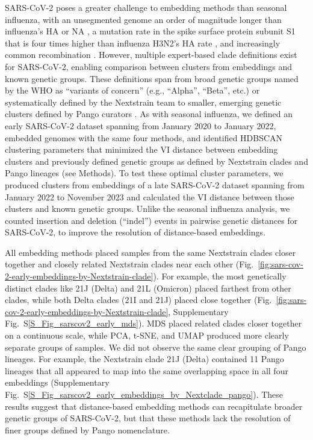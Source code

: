 \documentclass[webpdf,contemporary,large,single]{oup-authoring-template}%
\theoremstyle{thmstyleone}%
\theoremstyle{thmstyletwo}%
\theoremstyle{thmstylethree}%
\begin{document}
SARS-CoV-2 poses a greater challenge to embedding methods than seasonal influenza, with an unsegmented genome an order of magnitude longer than influenza's HA or NA \citep{Zhu2020}, a mutation rate in the spike surface protein subunit S1 that is four times higher than influenza H3N2's HA rate \citep{Kistler2022}, and increasingly common recombination \citep{Focosi2022,Turakhia2022}.
However, multiple expert-based clade definitions exist for SARS-CoV-2, enabling comparison between clusters from embeddings and known genetic groups.
These definitions span from broad genetic groups named by the WHO as ``variants of concern'' (e.g., ``Alpha'', ``Beta'', etc.) \citep{Konings2021} or systematically defined by the Nextstrain team \citep{Hodcroft2020,Bedford2021,Roemer2022} to smaller, emerging genetic clusters defined by Pango curators \citep{OToole2021}.
As with seasonal influenza, we defined an early SARS-CoV-2 dataset spanning from January 2020 to January 2022, embedded genomes with the same four methods, and identified HDBSCAN clustering parameters that minimized the VI distance between embedding clusters and previously defined genetic groups as defined by Nextstrain clades and Pango lineages (see Methods).
To test these optimal cluster parameters, we produced clusters from embeddings of a late SARS-CoV-2 dataset spanning from January 2022 to November 2023 and calculated the VI distance between those clusters and known genetic groups.
Unlike the seasonal influenza analysis, we counted insertion and deletion (``indel'') events in pairwise genetic distances for SARS-CoV-2, to improve the resolution of distance-based embeddings.

All embedding methods placed samples from the same Nextstrain clades closer together and closely related Nextstrain clades near each other (Fig.~\ref{fig:sars-cov-2-early-embeddings-by-Nextstrain-clade}).
For example, the most genetically distinct clades like 21J (Delta) and 21L (Omicron) placed farthest from other clades, while both Delta clades (21I and 21J) placed close together (Fig.~\ref{fig:sars-cov-2-early-embeddings-by-Nextstrain-clade}, Supplementary Fig.~S\ref{S_Fig_sarscov2_early_mds}).
MDS placed related clades closer together on a continuous scale, while PCA, t-SNE, and UMAP produced more clearly separate groups of samples.
We did not observe the same clear grouping of Pango lineages.
For example, the Nextstrain clade 21J (Delta) contained 11 Pango lineages that all appeared to map into the same overlapping space in all four embeddings (Supplementary Fig.~S\ref{S_Fig_sarscov2_early_embeddings_by_Nextclade_pango}).
These results suggest that distance-based embedding methods can recapitulate broader genetic groups of SARS-CoV-2, but that these methods lack the resolution of finer groups defined by Pango nomenclature.
\end{document}
